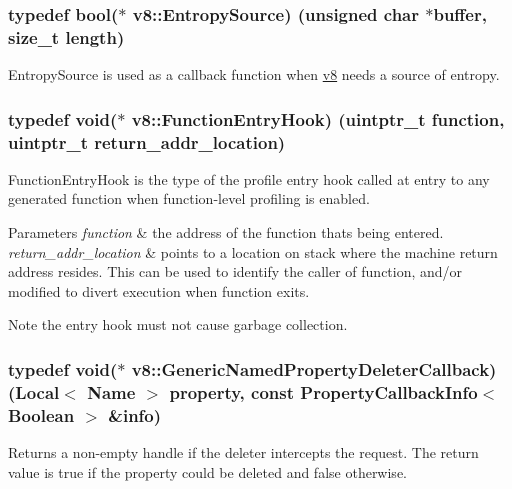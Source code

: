\subsubsection[{Entropy\+Source}]{\setlength{\rightskip}{0pt plus 5cm}typedef bool($\ast$ v8\+::\+Entropy\+Source) (unsigned char $\ast$buffer, size\+\_\+t length)}\label{namespacev8_ab699f4bbbb56350e6e915682e420fcdc}
Entropy\+Source is used as a callback function when \hyperlink{namespacev8}{v8} needs a source of entropy. \hypertarget{namespacev8_aaf07fb6bb13f295da3c6568938b7dec5}{}
\subsubsection[{Function\+Entry\+Hook}]{\setlength{\rightskip}{0pt plus 5cm}typedef void($\ast$ v8\+::\+Function\+Entry\+Hook) (uintptr\+\_\+t function, uintptr\+\_\+t return\+\_\+addr\+\_\+location)}\label{namespacev8_aaf07fb6bb13f295da3c6568938b7dec5}
Function\+Entry\+Hook is the type of the profile entry hook called at entry to any generated function when function-\/level profiling is enabled.


\begin{DoxyParams}{Parameters}
{\em function} & the address of the function that\textquotesingle{}s being entered. \\
\hline
{\em return\+\_\+addr\+\_\+location} & points to a location on stack where the machine return address resides. This can be used to identify the caller of {\ttfamily function}, and/or modified to divert execution when {\ttfamily function} exits.\\
\hline
\end{DoxyParams}
\begin{DoxyNote}{Note}
the entry hook must not cause garbage collection. 
\end{DoxyNote}
\hypertarget{namespacev8_ad2aecc0406ea4bc02d5a4f84a433b273}{}
\subsubsection[{Generic\+Named\+Property\+Deleter\+Callback}]{\setlength{\rightskip}{0pt plus 5cm}typedef void($\ast$ v8\+::\+Generic\+Named\+Property\+Deleter\+Callback) ({\bf Local}$<$ {\bf Name} $>$ property, const {\bf Property\+Callback\+Info}$<$ {\bf Boolean} $>$ \&info)}\label{namespacev8_ad2aecc0406ea4bc02d5a4f84a433b273}
Returns a non-\/empty handle if the deleter intercepts the request. The return value is true if the property could be deleted and false otherwise. \hypertarget{namespacev8_a20826eb7e52e84fa4f632534e8eddd04}{}
